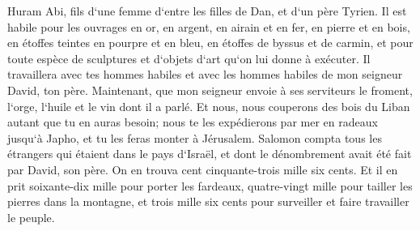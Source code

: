\verse Huram Abi, fils d`une femme d`entre les filles de Dan, et d`un père Tyrien. Il est habile pour les ouvrages en or, en argent, en airain et en fer, en pierre et en bois, en étoffes teintes en pourpre et en bleu, en étoffes de byssus et de carmin, et pour toute espèce de sculptures et d`objets d`art qu`on lui donne à exécuter. Il travaillera avec tes hommes habiles et avec les hommes habiles de mon seigneur David, ton père. 
\verse Maintenant, que mon seigneur envoie à ses serviteurs le froment, l`orge, l`huile et le vin dont il a parlé. 
\verse Et nous, nous couperons des bois du Liban autant que tu en auras besoin; nous te les expédierons par mer en radeaux jusqu`à Japho, et tu les feras monter à Jérusalem. 
\verse Salomon compta tous les étrangers qui étaient dans le pays d`Israël, et dont le dénombrement avait été fait par David, son père. On en trouva cent cinquante-trois mille six cents. 
\verse Et il en prit soixante-dix mille pour porter les fardeaux, quatre-vingt mille pour tailler les pierres dans la montagne, et trois mille six cents pour surveiller et faire travailler le peuple. 

\chapter{}

